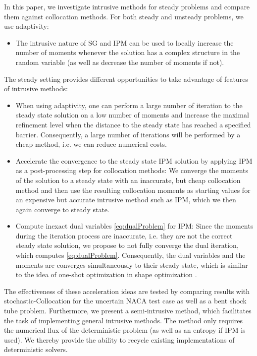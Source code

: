 In this paper, we investigate intrusive methods for steady problems and compare them against collocation methods. For both steady and unsteady problems, we use adaptivity: 
\begin{itemize}
\item The intrusive nature of SG and IPM can be used to locally increase the number of moments whenever the solution has a complex structure in the random variable (as well as decrease the number of moments if not).
\end{itemize}
The steady setting provides different opportunities to take advantage of features of intrusive methods: 
\begin{itemize}
\item When using adaptivity, one can perform a large number of iteration to the steady state solution on a low number of moments and increase the maximal refinement level when the distance to the steady state has reached a specified barrier. Consequently, a large number of iterations will be performed by a cheap method, i.e. we can reduce numerical costs. 
\item Accelerate the convergence to the steady state IPM solution by applying IPM as a post-processing step for collocation methods: We converge the moments of the solution to a steady state with an inaccurate, but cheap collocation method and then use the resulting collocation moments as starting values for an expensive but accurate intrusive method such as IPM, which we then again converge to steady state. 
\item Compute inexact dual variables \eqref{eq:dualProblem} for IPM: Since the moments during the iteration process are inaccurate, i.e. they are not the correct steady state solution, we propose to not fully converge the dual iteration, which computes \eqref{eq:dualProblem}. Consequently, the dual variables and the moments are converges simultaneously to their steady state, which is similar to the idea of one-shot optimization in shape optimization \cite{hazra2005aerodynamic}.
\end{itemize}

The effectiveness of these acceleration ideas are tested by comparing results with stochastic-Collocation for the uncertain NACA test case as well as a bent shock tube problem. Furthermore, we present a semi-intrusive method, which facilitates the task of implementing general intrusive methods. The method only requires the numerical flux of the deterministic problem (as well as an entropy if IPM is used). We thereby provide the ability to recycle existing implementations of deterministic solvers.

